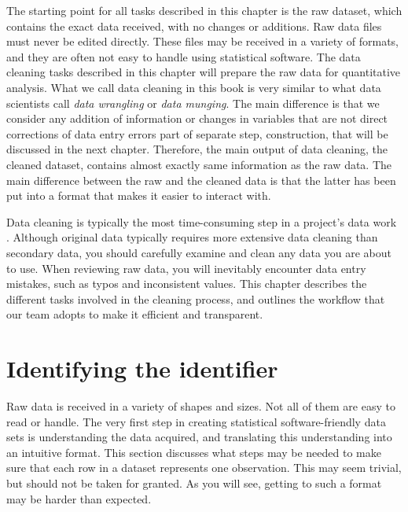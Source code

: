 
\begin{fullwidth}

The starting point for all tasks described in this chapter is the raw dataset,
which contains the exact data received, with no changes or additions.
Raw data files must never be edited directly.
These files may be received in a variety of formats, 
and they are often not easy to handle using statistical software.
The data cleaning tasks described in this chapter will prepare the raw data
for quantitative analysis.
What we call data cleaning in this book is very similar to what data scientists call
\textit{data wrangling} or \textit{data munging}.
The main difference is that we consider any addition of information or changes in variables
that are not direct corrections of data entry errors part of separate step,
construction, that will be discussed in the next chapter.
Therefore, the main output of data cleaning, the cleaned dataset,
contains almost exactly same information as the raw data.
The main difference between the raw and the cleaned data is that the latter
has been put into a format that makes it easier to interact with. 

Data cleaning is typically the most time-consuming step in a project's data work \citep{dasu2003exploratory}.
Although original data typically requires more extensive data cleaning than secondary data,
you should carefully examine and clean any data you are about to use.
When reviewing raw data, you will inevitably encounter data entry mistakes,
such as typos and inconsistent values.
This chapter describes the different tasks involved in the cleaning process,
and outlines the workflow that our team adopts to make it efficient and transparent.

\end{fullwidth}


\section{Identifying the identifier}

Raw data is received in a variety of shapes and sizes.
Not all of them are easy to read or handle.
The very first step in creating statistical software-friendly data sets
is understanding the data acquired,
and translating this understanding into an intuitive format.
This section discusses what steps may be needed to make sure that each row
in a dataset represents one observation.
This may seem trivial, but should not be taken for granted.
As you will see, getting to such a format may be harder than expected.



